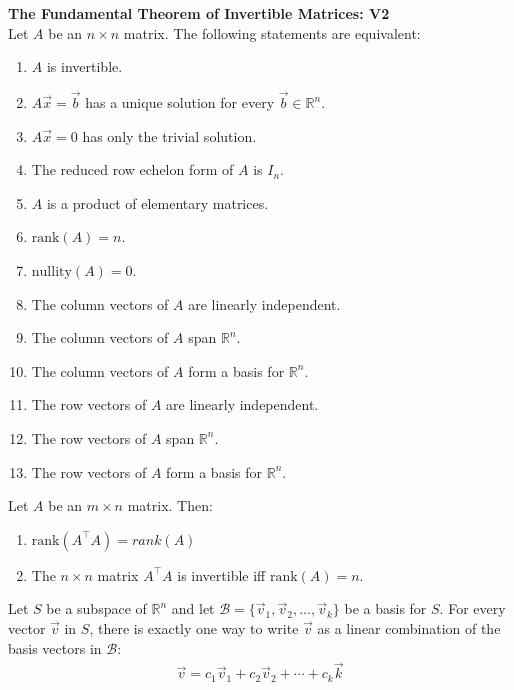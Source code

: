 \documentclass{article}
\begin{document}
\begin{theorem}
	\textbf{The Fundamental Theorem of Invertible Matrices: V2}\\
	Let $A$ be an $n\times n$ matrix. The following statements are equivalent:
	\begin{enumerate}
		\item $A$ is invertible.
		\item $A\vec x = \vec b$ has a unique solution for every $\vec b\in\mathbb{R}^n$.
		\item $A\vec x = 0$ has only the trivial solution.
		\item The reduced row echelon form of $A$ is $I_n$.
		\item $A$ is a product of elementary matrices.
		\item $\text{rank}(A)=n$.
		\item $\text{nullity}(A)=0$.
		\item The column vectors of $A$ are linearly independent.
		\item The column vectors of $A$ span $\mathbb{R}^n$.
		\item The column vectors of $A$ form a basis for $\mathbb{R}^n$.
		\item The row vectors of $A$ are linearly independent.
		\item The row vectors of $A$ span $\mathbb{R}^n$.
		\item The row vectors of $A$ form a basis for $\mathbb{R}^n$.
	\end{enumerate}
\end{theorem}
\begin{theorem}
	Let $A$ be an $m\times n$ matrix. Then:
	\begin{enumerate}
		\item $\text{rank}(A^\intercal A) = rank(A)$
		\item The $n\times n$ matrix $A^\intercal A$ is invertible iff $\text{rank}(A)=n$.
	\end{enumerate}
\end{theorem}
\begin{theorem}
	Let $S$ be a subspace of $\mathbb{R}^n$ and let $\mathcal{B}=\{\vec v_1, \vec v_2, ..., \vec v_k\}$ be a basis for $S$. For every vector $\vec v$ in $S$, there is exactly one way to write $\vec v$ as a linear combination of the basis vectors in $\mathcal{B}$:
	\begin{gather*}
		\vec v = c_1\vec v_1 + c_2\vec v_2 + \cdots + c_k\vec k
	\end{gather*}
\end{theorem}
\end{document}
